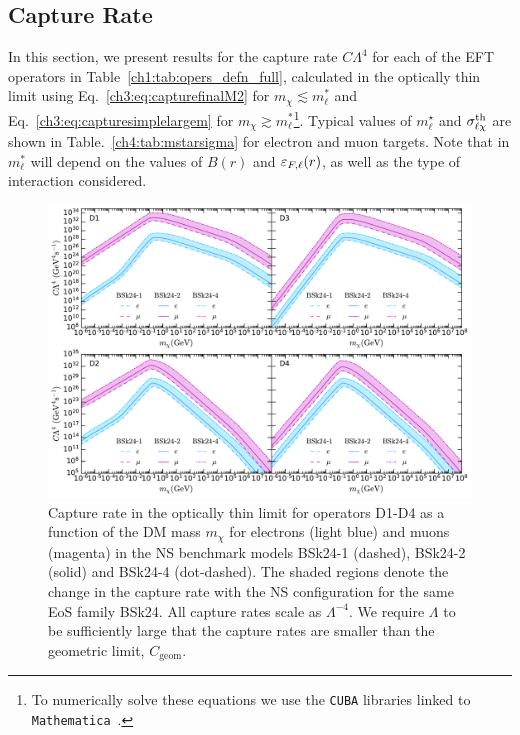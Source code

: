 \subsection{Capture Rate}
\label{ch4:subsec:caprateresults}

In this section, we present results for the capture rate $C\Lambda^4$ for each of the EFT operators in Table~\ref{ch1:tab:opers_defn_full}, calculated in the optically thin limit using Eq.~\ref{ch3:eq:capturefinalM2} for $m_\chi\lesssim m_\ell^*$ and  Eq.~\ref{ch3:eq:capturesimplelargem} for $m_\chi\gtrsim m_\ell^*$\footnote{To numerically solve these equations we use the \texttt{CUBA} libraries \cite{Hahn:2004fe_CUBALibrarymultidimensional, Hahn:2014fua_Concurrentcuba} linked to \texttt{Mathematica}~\cite{Mathematica}.}. Typical values of $m_\ell^\star$ and $\sigma^{\rm th}_{\ell\chi}$ are shown in Table.~\ref{ch4:tab:mstarsigma} for electron and muon targets. Note that in $m_\ell^*$ will depend on the values of $B(r)$ and $\varepsilon_{F,\ell}(r)$, as well as the type of interaction considered. 

\begin{figure}[t] 
    \centering
    \includegraphics[width=\textwidth]{capture_2/D1_D4_C_mDM_lept.pdf}
    \caption[Capture rate in the optically thin limit for operators D1-D4 as a function of the DM mass $m_\chi$ for electrons (light blue) and muons (magenta) in the NS benchmark models BSk24-1 (dashed), BSk24-2 (solid) and BSk24-4 (dot-dashed).]{Capture rate in the optically thin limit for operators D1-D4 as a function of the DM mass $m_\chi$ for electrons (light blue) and muons (magenta) in the NS benchmark models BSk24-1 (dashed), BSk24-2 (solid) and BSk24-4 (dot-dashed). The shaded regions denote the change in the capture rate with the NS configuration for the same EoS family BSk24. 
    All capture rates scale as $\Lambda^{-4}$. We require $\Lambda$ to be sufficiently large that the capture rates are smaller than the geometric limit, $C_\mathrm{geom}$. 
    }
    \label{ch4:fig:capratesD1D4}
    \end{figure} 
    
